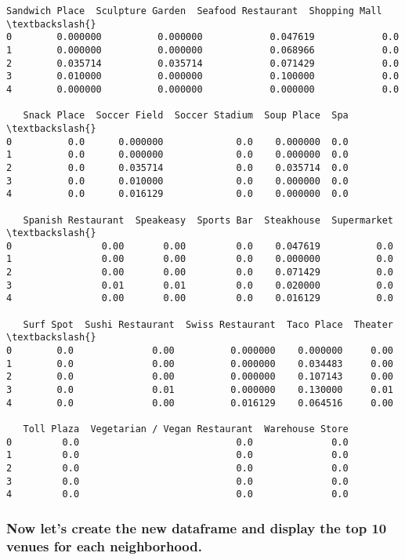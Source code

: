 \documentclass[11pt]{article}
\begin{document}
\begin{tcolorbox}[breakable, size=fbox, boxrule=.5pt, pad at break*=1mm, opacityfill=0]
\begin{Verbatim}[commandchars=\\\{\}]
   Sandwich Place  Sculpture Garden  Seafood Restaurant  Shopping Mall  \textbackslash{}
0        0.000000          0.000000            0.047619            0.0
1        0.000000          0.000000            0.068966            0.0
2        0.035714          0.035714            0.071429            0.0
3        0.010000          0.000000            0.100000            0.0
4        0.000000          0.000000            0.000000            0.0

   Snack Place  Soccer Field  Soccer Stadium  Soup Place  Spa  \textbackslash{}
0          0.0      0.000000             0.0    0.000000  0.0
1          0.0      0.000000             0.0    0.000000  0.0
2          0.0      0.035714             0.0    0.035714  0.0
3          0.0      0.010000             0.0    0.000000  0.0
4          0.0      0.016129             0.0    0.000000  0.0

   Spanish Restaurant  Speakeasy  Sports Bar  Steakhouse  Supermarket  \textbackslash{}
0                0.00       0.00         0.0    0.047619          0.0
1                0.00       0.00         0.0    0.000000          0.0
2                0.00       0.00         0.0    0.071429          0.0
3                0.01       0.01         0.0    0.020000          0.0
4                0.00       0.00         0.0    0.016129          0.0

   Surf Spot  Sushi Restaurant  Swiss Restaurant  Taco Place  Theater  \textbackslash{}
0        0.0              0.00          0.000000    0.000000     0.00
1        0.0              0.00          0.000000    0.034483     0.00
2        0.0              0.00          0.000000    0.107143     0.00
3        0.0              0.01          0.000000    0.130000     0.01
4        0.0              0.00          0.016129    0.064516     0.00

   Toll Plaza  Vegetarian / Vegan Restaurant  Warehouse Store
0         0.0                            0.0              0.0
1         0.0                            0.0              0.0
2         0.0                            0.0              0.0
3         0.0                            0.0              0.0
4         0.0                            0.0              0.0
\end{Verbatim}
\end{tcolorbox}
        
    \hypertarget{now-lets-create-the-new-dataframe-and-display-the-top-10-venues-for-each-neighborhood.}{%
\subsubsection{Now let's create the new dataframe and display the top 10
venues for each
neighborhood.}\label{now-lets-create-the-new-dataframe-and-display-the-top-10-venues-for-each-neighborhood.}}
\end{document}
